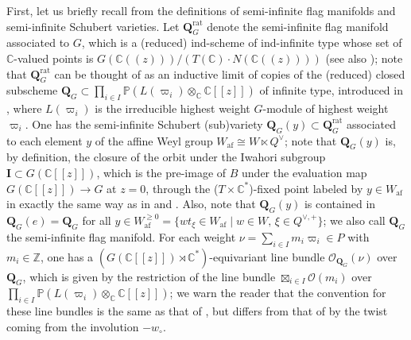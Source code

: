 \documentclass[11pt,a4paper,reqno,dvipdfmx]{amsart}
\numberwithin{equation}{section}
\newcommand{\BZ}{\mathbb{Z}}
\newcommand{\BC}{\mathbb{C}}
\newcommand{\BP}{\mathbb{P}}
\newcommand{\CO}{\mathcal{O}}
\newcommand{\bI}{\mathbf{I}}
\newcommand{\af}{\mathrm{af}}
\newcommand{\lng}{w_{\circ}}
\newcommand{\bra}[1]{[\![#1]\!]}
\newcommand{\pra}[1]{(\!(#1)\!)}
\newcommand{\QG}{\mathbf{Q}_{G}}
\newcommand{\QGr}{\mathbf{Q}_{G}^{\mathrm{rat}}}
\theoremstyle{plain}
\theoremstyle{definition}
\theoremstyle{remark}
\begin{document}
First, let us briefly recall from \cite[\S2.3]{Kat1} 
the definitions of semi-infinite flag manifolds and semi-infinite Schubert varieties. 
Let $\QGr$ denote the semi-infinite flag manifold associated to $G$, 
which is a (reduced) ind-scheme of ind-infinite type whose set of 
$\BC$-valued points is $G(\BC\pra{z})/(T(\BC) \cdot N(\BC\pra{z}))$ 
(see also \cite{KaNS, Kat2}); note that $\QGr$ can be thought of 
as an inductive limit of copies of the (reduced) closed subscheme 
$\QG \subset \prod_{i \in I} \BP(L(\varpi_{i}) \otimes_{\BC} \BC\bra{z})$ 
of infinite type, introduced in \cite[\S4.1]{FM}, 
where $L(\varpi_{i})$ is the irreducible highest weight $G$-module 
of highest weight $\varpi_{i}$. 
One has the semi-infinite Schubert (sub)variety 
$\QG(y) \subset \QGr$ associated to each element $y$ of 
the affine Weyl group $W_{\af} \cong W \ltimes Q^{\vee}$; 
note that $\QG(y)$ is, by definition, the closure of 
the orbit under the Iwahori subgroup $\bI \subset G(\BC\bra{z})$, 
which is the pre-image of $B$ under the evaluation map $G(\BC\bra{z}) \rightarrow G$ at $z = 0$, 
through the ($T \times \BC^{*}$)-fixed point labeled by 
$y \in W_{\af}$ in exactly the same way as in 
\cite[\S4.2]{KaNS} and \cite[\S2.3]{Orr}. 
Also, note that $\QG(y)$ is contained in 
$\QG(e) = \QG$ for all $y \in W_{\af}^{\geq 0} = 
\bigl\{w t_{\xi} \in W_{\af} \mid w \in W,\,\xi \in Q^{\vee,+} \bigr\}$; 
we also call $\QG$ the semi-infinite flag manifold. 
For each weight $\nu = \sum_{i \in I} m_{i} \varpi_{i} \in P$ 
with $m_{i} \in \BZ$, one has a $(G(\BC\bra{z}) \rtimes \BC^{*})$-equivariant 
line bundle $\CO_{\QG}(\nu)$ over $\QG$, which is given by the restriction of 
the line bundle $\boxtimes_{i \in I} \CO(m_{i})$ over 
$\prod_{i \in I} \BP(L(\varpi_{i}) \otimes_{\BC} \BC\bra{z})$; 
we warn the reader that the convention for these line bundles is 
the same as that of \cite{KaNS}, but differs from that of \cite{Kat2} 
by the twist coming from the involution $- \lng$. 
\end{document}
